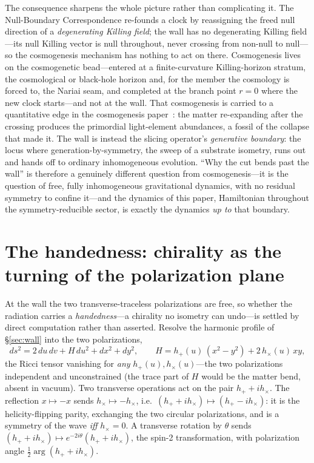 \documentclass[11pt,a4paper]{article}
\theoremstyle{plain}
\theoremstyle{definition}
\theoremstyle{remark}
\begin{document}
The consequence sharpens the whole picture rather than complicating it. The Null-Boundary Correspondence re-founds a clock by reassigning the freed null direction of a \emph{degenerating Killing field}; the wall has no degenerating Killing field---its null Killing vector is null throughout, never crossing from non-null to null---so the cosmogenesis mechanism has nothing to act on there. Cosmogenesis lives on the cosmogenetic bead---entered at a finite-curvature Killing-horizon stratum, the cosmological or black-hole horizon and, for the member the cosmology is forced to, the Nariai seam, and completed at the branch point $r=0$ where the new clock starts---and not at the wall. That cosmogenesis is carried to a quantitative edge in the cosmogenesis paper~\cite{JanzenCosmogenesis}: the matter re-expanding after the crossing produces the primordial light-element abundances, a fossil of the collapse that made it. The wall is instead the slicing operator's \emph{generative boundary}: the locus where generation-by-symmetry, the sweep of a substrate isometry, runs out and hands off to ordinary inhomogeneous evolution. ``Why the cut bends past the wall'' is therefore a genuinely different question from cosmogenesis---it is the question of free, fully inhomogeneous gravitational dynamics, with no residual symmetry to confine it---and the dynamics of this paper, Hamiltonian throughout the symmetry-reducible sector, is exactly the dynamics \emph{up to} that boundary.

\section{The handedness: chirality as the turning of the polarization plane}\label{sec:chirality}

At the wall the two transverse-traceless polarizations are free, so whether the radiation carries a \emph{handedness}---a chirality no isometry can undo---is settled by direct computation rather than asserted. Resolve the harmonic profile of \S\ref{sec:wall} into the two polarizations,
\begin{equation}\label{eq:Hpol}
ds^2 = 2\,du\,dv + H\,du^2 + dx^2 + dy^2,\qquad H = h_+(u)\,(x^2-y^2) + 2\,h_\times(u)\,xy,
\end{equation}
the Ricci tensor vanishing for \emph{any} $h_+(u),h_\times(u)$---the two polarizations independent and unconstrained (the trace part of $H$ would be the matter bend, absent in vacuum). Two transverse operations act on the pair $h_++ih_\times$. The reflection $x\mapsto-x$ sends $h_\times\mapsto-h_\times$, i.e.\ $(h_++ih_\times)\mapsto(h_+-ih_\times)$: it is the helicity-flipping parity, exchanging the two circular polarizations, and is a symmetry of the wave \emph{iff} $h_\times=0$. A transverse rotation by $\theta$ sends $(h_++ih_\times)\mapsto e^{-2i\theta}(h_++ih_\times)$, the spin-2 transformation, with polarization angle $\tfrac12\arg(h_++ih_\times)$.
\end{document}
